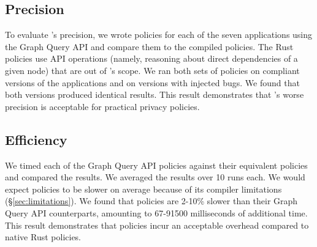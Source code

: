\subsection{Precision}
\label{sec:precision}
To evaluate \syslang's precision, we wrote policies for each of the seven applications using the Graph Query API and compare them to the compiled \syslang{} policies.
%
The Rust policies use API operations (namely, reasoning about direct dependencies of a given node) that are out of \syslang's scope.
%
We ran both sets of policies on compliant versions of the applications and on versions with injected bugs.
%
We found that both versions produced identical results.
%
This result demonstrates that \syslang's worse precision is acceptable for practical privacy policies.

\subsection{Efficiency}
\label{sec:efficiency}
We timed each of the Graph Query API policies against their equivalent \syslang{} policies and compared the results.
%
We averaged the results over 10 runs each.
%
We would expect \syslang{} policies to be slower on average because of its compiler limitations (\S\ref{sec:limitations}).
%
We found that \syslang{} policies are 2-10\% slower than their Graph Query API counterparts,
amounting to 67-91500 milliseconds of additional time.
%
This result demonstrates that \syslang{} policies incur an acceptable overhead compared to native Rust policies.


